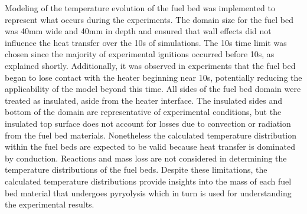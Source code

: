     Modeling of the temperature evolution of the fuel bed was implemented to represent what occurs during the experiments. The domain size for the fuel bed was 40\si{\milli\meter} wide and 40\si{\milli\meter} in depth and ensured that wall effects did not influence the heat transfer over the 10\si{\second} of simulations. The 10\si{\second} time limit was chosen since the majority of experimental ignitions occurred before 10\si{\second}, as explained shortly. Additionally, it was observed in experiments that the fuel bed began to lose contact with the heater beginning near 10\si{\second}, potentially reducing the applicability of the model beyond this time. All sides of the fuel bed domain were treated as insulated, aside from the heater interface. The insulated sides and bottom of the domain are representative of experimental conditions, but the insulated top surface does not account for losses due to convection or radiation from the fuel bed materials.  Nonetheless the calculated temperature distribution within the fuel beds are expected to be valid because heat transfer is dominated by conduction. Reactions and mass loss are not considered in determining the temperature distributions of the fuel beds. Despite these limitations, the calculated temperature distributions provide insights into the mass of each fuel bed material that undergoes pyryolysis which in turn is used for understanding the experimental results.

